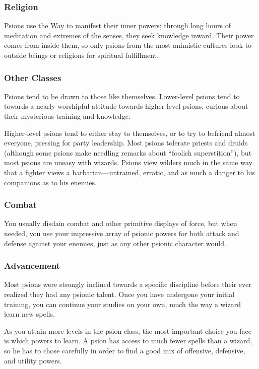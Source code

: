 \subsubsection{Religion}
Psions use the Way to manifest their inner powers; through long hours of meditation and extremes of the senses, they seek knowledge inward. Their power comes from inside them, so only psions from the most animistic cultures look to outside beings or religions for spiritual fulfillment.

\subsubsection{Other Classes}
Psions tend to be drawn to those like themselves. Lower-level psions tend to towards a nearly worshipful attitude towards higher level psions, curious about their mysterious training and knowledge.

Higher-level psions tend to either stay to themselves, or to try to befriend almost everyone, pressing for party leadership. Most psions tolerate priests and druids (although some psions make needling remarks about ``foolish superstition''), but most psions are uneasy with wizards. Psions view wilders much in the same way that a fighter views a barbarian---untrained, erratic, and as much a danger to his companions as to his enemies.

\subsubsection{Combat}
You usually disdain combat and other primitive displays of force, but when needed, you use your impressive array of psionic powers for both attack and defense against your enemies, just as any other psionic character would.

\subsubsection{Advancement}
Most psions were strongly inclined towards a specific discipline before their ever realized they had any psionic talent. Once you have undergone your initial training, you can continue your studies on your own, much the way a wizard learn new spells.

As you attain more levels in the psion class, the most important choice you face is which powers to learn. A psion has access to much fewer spells than a wizard, so he has to chose carefully in order to find a good mix of offensive, defensive, and utility powers.

